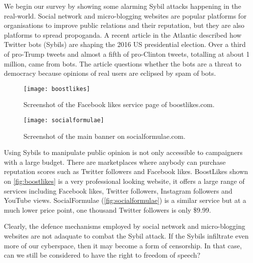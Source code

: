 We begin our survey by showing some alarming Sybil attacks happening in the
real-world. Social network and micro-blogging websites are popular platforms for
organisations to improve public relations and their reputation, but they are
also platforms to spread propoganda. A recent article in the Atlantic described
how Twitter bots (Sybils) are shaping the 2016 US presidential
election\cite{atlantictwitterbots}. Over a third of pro-Trump tweets and almost
a fifth of pro-Clinton tweets, totalling at about 1 million, came from bots. The
article questions whether the bots are a threat to democracy because opinions of
real users are eclipsed by spam of bots.

\begin{figure}
  \centering
  \texttt{[image: boostlikes]}
  \caption{Screenshot of the Facebook likes service page of boostlikes.com.}
  \label{fig:boostlikes}
\end{figure}

\begin{figure*}
  \texttt{[image: socialformulae]}
  \caption{Screenshot of the main banner on socialformulae.com.}
  \label{fig:socialformulae}
\end{figure*}

Using Sybils to manipulate public opinion is not only accessible to campaigners
with a large budget. There are marketplaces where anybody can purchase
reputation scores such as Twitter followers and Facebook likes. BoostLikes shown
on \autoref{fig:boostlikes} is a very professional looking website, it offers a
large range of services including Facebook likes, Twitter followers, Instagram
followers and YouTube views. SocialFormulae (\autoref{fig:socialformulae}) is a
similar service but at a much lower price point, one thousand Twitter followers
is only \$9.99.

Clearly, the defence mechanisms employed by social network and micro-blogging
websites are not adaquate to combat the Sybil attack. If the Sybils infiltrate
even more of our cyberspace, then it may become a form of censorship. In that
case, can we still be considered to have the right to freedom of speech?


